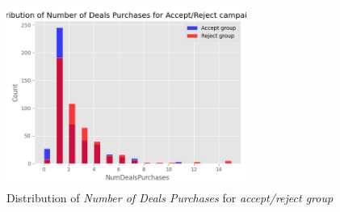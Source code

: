 \documentclass[a4paper,12pt]{article}
\begin{document}
\begin{figure}[H]
    \centering
    \includegraphics[width=0.7\textwidth]{./images/distro_num_of_deal_purchases_accept_reject_campaign.png}
    \caption{Distribution of \textit{Number of Deals Purchases} for \textit{accept/reject group}}
    \label{fig:Figure_8}
\end{figure}


\end{document}
